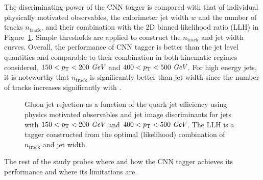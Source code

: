 The discriminating power of the CNN tagger is compared with that of individual physically motivated observables, the calorimeter jet width $w$ and the number of tracks $n_\text{track}$, and their combination with the 2D binned likelihood ratio (LLH) in Figure~\ref{fig:classifiers}.  Simple thresholds are applied to construct the $n_\text{track}$ and jet width curves.  Overall, the performance of CNN tagger is better than the jet level quantities and comparable to their combination in both kinematic regimes considered, $150<p_{{\rm T}}<200~\textit{GeV}$ and $400<p_{{\rm T}}<500~\textit{GeV}$. For high energy jets, it is noteworthy that $n_\text{track}$ is significantly better than jet width since the number of tracks increases significantly with \pt. 

\begin{figure}[htpb]
\begin{center}
\caption{Gluon jet rejection as a function of the quark jet efficiency using physics motivated observables and jet image discriminants
for jets with \protect{} $150<p_{{\rm T}}<200~\textit{GeV}$ and \protect{} $400<p_{{\rm T}}<500~\textit{GeV}$.  The LLH is a tagger constructed from the optimal (likelihood) combination of $n_\text{track}$ and jet width. }
\label{fig:classifiers}
\end{center}
\end{figure}

The rest of the study probes where and how the CNN tagger achieves its performance and where its limitations are.

